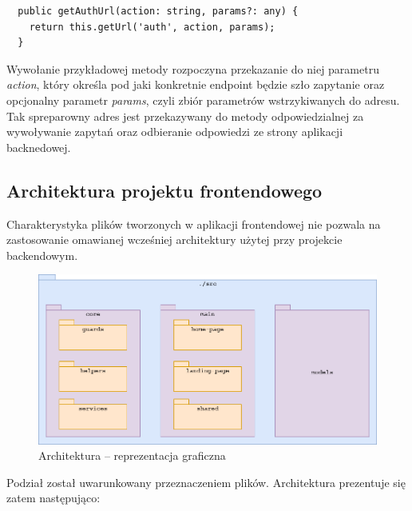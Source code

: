 \begin{lstlisting}
  public getAuthUrl(action: string, params?: any) {
    return this.getUrl('auth', action, params);
  }
\end{lstlisting}
Wywołanie przykładowej metody rozpoczyna przekazanie do niej parametru \textit{action}, który określa pod jaki konkretnie endpoint będzie szło zapytanie oraz opcjonalny parametr \textit{params}, czyli zbiór parametrów wstrzykiwanych do adresu. Tak spreparowny adres jest przekazywany do metody odpowiedzialnej za wywoływanie zapytań oraz odbieranie odpowiedzi ze strony aplikacji backnedowej.

\subsection{Architektura projektu frontendowego}
Charakterystyka plików tworzonych w aplikacji frontendowej nie pozwala na zastosowanie omawianej wcześniej architektury użytej przy projekcie backendowym.
\begin{figure}[H]
  \centering
  \includegraphics[width=1\linewidth]{rysunki/angular-arch.png}
  \caption{Architektura -- reprezentacja graficzna}
  \label{fig:angular-architecture}
\end{figure}
Podział został uwarunkowany przeznaczeniem plików. Architektura prezentuje się zatem następująco:
